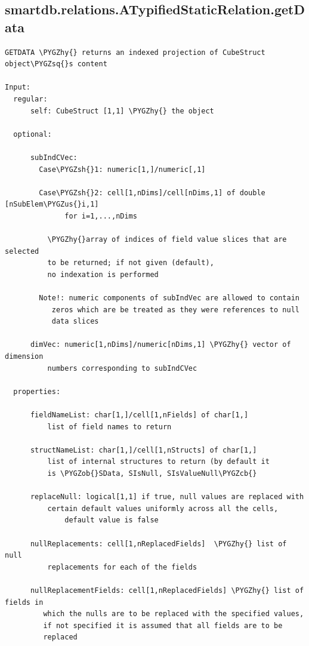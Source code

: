 \documentclass[letterpaper,10pt,english]{sphinxmanual}
\def\PYGZus{\char`\_}
\def\PYGZob{\char`\{}
\def\PYGZcb{\char`\}}
\def\PYGZsh{\char`\#}
\def\PYGZhy{\char`\-}
\def\PYGZsq{\char`\'}
\begin{document}
\subsection{smartdb.relations.ATypifiedStaticRelation.getData}
\label{chap_functions:smartdb-relations-atypifiedstaticrelation-getdata}
\begin{Verbatim}[commandchars=\\\{\}]
GETDATA \PYGZhy{} returns an indexed projection of CubeStruct object\PYGZsq{}s content

Input:
  regular:
      self: CubeStruct [1,1] \PYGZhy{} the object

  optional:

      subIndCVec:
        Case\PYGZsh{}1: numeric[1,]/numeric[,1]

        Case\PYGZsh{}2: cell[1,nDims]/cell[nDims,1] of double [nSubElem\PYGZus{}i,1]
              for i=1,...,nDims

          \PYGZhy{}array of indices of field value slices that are selected
          to be returned; if not given (default),
          no indexation is performed

        Note!: numeric components of subIndVec are allowed to contain
           zeros which are be treated as they were references to null
           data slices

      dimVec: numeric[1,nDims]/numeric[nDims,1] \PYGZhy{} vector of dimension
          numbers corresponding to subIndCVec

  properties:

      fieldNameList: char[1,]/cell[1,nFields] of char[1,]
          list of field names to return

      structNameList: char[1,]/cell[1,nStructs] of char[1,]
          list of internal structures to return (by default it
          is \PYGZob{}SData, SIsNull, SIsValueNull\PYGZcb{}

      replaceNull: logical[1,1] if true, null values are replaced with
          certain default values uniformly across all the cells,
              default value is false

      nullReplacements: cell[1,nReplacedFields]  \PYGZhy{} list of null
          replacements for each of the fields

      nullReplacementFields: cell[1,nReplacedFields] \PYGZhy{} list of fields in
         which the nulls are to be replaced with the specified values,
         if not specified it is assumed that all fields are to be
         replaced


\end{Verbatim}
\end{document}
